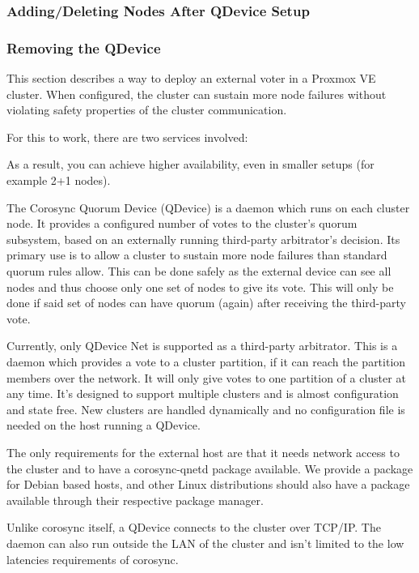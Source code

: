 \subsubsection{Adding/Deleting Nodes After QDevice Setup}

\subsubsection{Removing the QDevice}

This section describes a way to deploy an external voter in a Proxmox VE cluster. When configured, the cluster can sustain more node failures without violating safety properties of the cluster communication.

For this to work, there are two services involved:

As a result, you can achieve higher availability, even in smaller setups (for example 2+1 nodes).

The Corosync Quorum Device (QDevice) is a daemon which runs on each cluster node. It provides a configured number of votes to the cluster’s quorum subsystem, based on an externally running third-party arbitrator’s decision. Its primary use is to allow a cluster to sustain more node failures than standard quorum rules allow. This can be done safely as the external device can see all nodes and thus choose only one set of nodes to give its vote. This will only be done if said set of nodes can have quorum (again) after receiving the third-party vote.

Currently, only QDevice Net is supported as a third-party arbitrator. This is a daemon which provides a vote to a cluster partition, if it can reach the partition members over the network. It will only give votes to one partition of a cluster at any time. It’s designed to support multiple clusters and is almost configuration and state free. New clusters are handled dynamically and no configuration file is needed on the host running a QDevice.

The only requirements for the external host are that it needs network access to the cluster and to have a corosync-qnetd package available. We provide a package for Debian based hosts, and other Linux distributions should also have a package available through their respective package manager.

Unlike corosync itself, a QDevice connects to the cluster over TCP/IP. The daemon can also run outside the LAN of the cluster and isn’t limited to the low latencies requirements of corosync.


